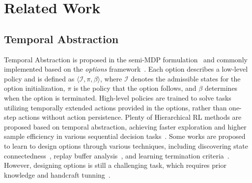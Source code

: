 \section{Related Work}
\subsection{Temporal Abstraction}
Temporal Abstraction is proposed in the semi-MDP formulation~\citep{sutton1999between,precup2000temporal} and commonly implemented based on the \emph{options} framework~\citep{stolle2002learning,bacon2017option,harutyunyan2018learning}.
Each option describes a low-level policy and is defined as $\langle\mathcal{I},\pi,\beta\rangle $, where $\mathcal{I}$ denotes the admissible states for the option initialization, $\pi$ is the policy that the option follows, and $\beta$ determines when the option is terminated.
High-level policies are trained to solve tasks utilizing temporally extended actions provided in the options, rather than one-step actions without action persistence.
Plenty of Hierarchical RL methods are proposed based on temporal abstraction, achieving faster exploration and higher sample efficiency in various sequential decision tasks~\citep{lin2021juewu,yang2021hierarchical}.
Some works are proposed to learn to design options through various techniques, including discovering state connectedness~\citep{chaganty2012learning}, replay buffer analysis~\citep{eysenbach2019search}, and learning termination criteria~\citep{vezhnevets2016strategic,harutyunyan2019termination}.
However, designing options is still a challenging task, which requires prior knowledge and handcraft tunning~\citep{pateria2021hierarchical,yu2021taac,lee2024learning}. 


